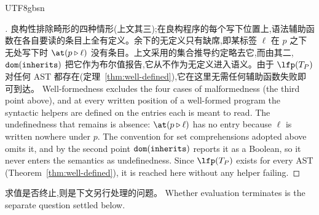 \begin{CJK*}{UTF8}{gbsn}
\fi



\begin{proof}[]
\ifPaperChinese
良构性排除畸形的四种情形(上文其三);在良构程序的每个写下位置上,语法辅助函数在各自要读的条目上全有定义。余下的无定义只有缺席,即某标签 $\ell$ 在 $p$ 之下无处写下时 $\at(p \snoc \ell)$ 没有条目。上文采用的集合推导约定略去它,而由其二,$\mathtt{dom}(\mathtt{inherits})$ 把它作为布尔值报告,它从不作为无定义进入语义。由于 $\lfp(T_P)$ 对任何 AST 都存在(定理~\ref{thm:well-defined}),它在这里无需任何辅助函数失败即可到达。
\else
Well-formedness excludes the four cases of malformedness (the third point above), and at every
written position of a well-formed program the syntactic helpers are defined on the entries each is
meant to read. The undefinedness that remains is absence: $\at(p \snoc \ell)$ has no entry because
$\ell$ is written nowhere under $p$. The convention for set comprehensions adopted above omits it,
and by the second point $\mathtt{dom}(\mathtt{inherits})$ reports it as a Boolean, so it never enters the semantics
as undefinedness. Since $\lfp(T_P)$ exists for every AST (Theorem~\ref{thm:well-defined}), it is
reached here without any helper failing.
\fi
\end{proof}

\ifPaperChinese
求值是否终止,则是下文另行处理的问题。
\else
Whether evaluation terminates is the separate question settled below.
\fi


\end{CJK*}

